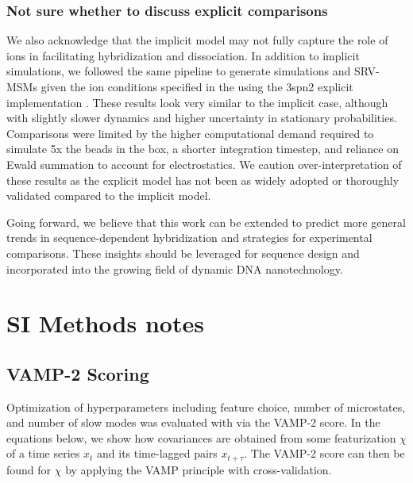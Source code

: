 \documentclass[journal=jpcbfk,manuscript=article]{achemso}
\begin{document}
\subsubsection{\label{sec:conc}Not sure whether to discuss explicit comparisons} 
We also acknowledge that the implicit model may not fully capture the role of ions in facilitating hybridization and dissociation. In addition to implicit simulations, we followed the same pipeline to generate simulations and SRV-MSMs given the ion conditions specified in the \citet{Sanstead2016} using the 3spn2 explicit implementation \citep{Hinckley2015}. These results look very similar to the implicit case, although with slightly slower dynamics and higher uncertainty in stationary probabilities. Comparisons were limited by the higher computational demand required to simulate 5x the beads in the box, a shorter integration timestep, and reliance on Ewald summation to account for electrostatics. We caution over-interpretation of these results as the explicit model has not been as widely adopted or thoroughly validated compared to the implicit model.

Going forward, we believe that this work can be extended to predict more general trends in sequence-dependent hybridization and strategies for experimental comparisons. These insights should be leveraged for sequence design and incorporated into the growing field of dynamic DNA nanotechnology. 


\section{\label{sec:Results}SI Methods notes}



\subsection{VAMP-2 Scoring}
Optimization of hyperparameters including feature choice, number of microstates, and number of slow modes was evaluated with via the VAMP-2 score. In the equations below, we show how covariances are obtained from some featurization $\chi$ of a time series $x_t$ and its time-lagged pairs $x_{t+\tau}$. The VAMP-2 score can then be found for $\chi$ by applying the VAMP principle with cross-validation.
\end{document}
